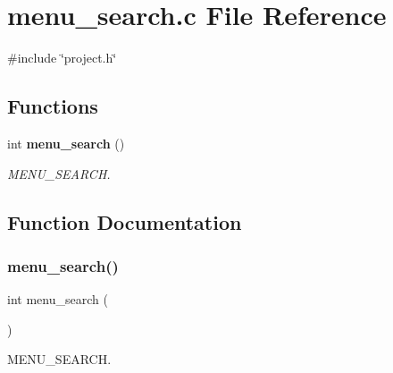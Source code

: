 \section{menu\+\_\+search.\+c File Reference}
\label{menu__search_8c}
{\ttfamily \#include \char`\"{}project.\+h\char`\"{}}\newline
\subsection*{Functions}
\begin{DoxyCompactItemize}
\item 
int \textbf{ menu\+\_\+search} ()
\begin{DoxyCompactList}\small\item\em M\+E\+N\+U\+\_\+\+S\+E\+A\+R\+CH. \end{DoxyCompactList}\end{DoxyCompactItemize}


\subsection{Function Documentation}
\mbox{\label{menu__search_8c_a0fa77fad4bd4f6d18677cc1ab442172b}} 
\subsubsection{menu\_search()}
{\footnotesize\ttfamily int menu\+\_\+search (\begin{DoxyParamCaption}{ }\end{DoxyParamCaption})}



M\+E\+N\+U\+\_\+\+S\+E\+A\+R\+CH. 

